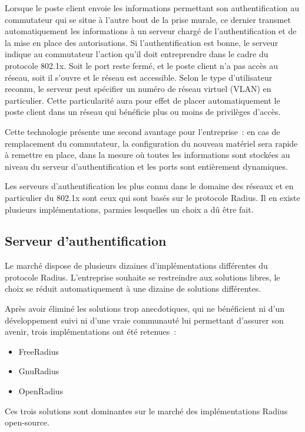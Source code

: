 Lorsque le poste client envoie les informations permettant son authentification au commutateur qui se situe à l'autre bout de la prise murale, ce dernier transmet automatiquement les informations à un serveur chargé de l'authentification et de la mise en place des autorisations. Si l'authentification est bonne, le serveur indique au commutateur l'action qu'il doit entreprendre dans le cadre du protocole 802.1x. Soit le port reste fermé, et le poste client n'a pas accès au réseau, soit il s'ouvre et le réseau est accessible. Selon le type d'utilisateur reconnu, le serveur peut spécifier un numéro de réseau virtuel (VLAN) en particulier. Cette particularité aura pour effet de placer automatiquement le poste client dans un réseau qui bénéficie plus ou moins de privilèges d'accès.

Cette technologie présente une second avantage pour l'entreprise~: en cas de remplacement du commutateur, la configuration du nouveau matériel sera rapide à remettre en place, dans la mesure où toutes les informations sont stockées au niveau du serveur d'authentification et les ports sont entièrement dynamiques.

Les serveurs d'authentification les plus connu dans le domaine des réseaux et en particulier du 802.1x sont ceux qui sont basés sur le protocole Radius. Il en existe plusieurs implémentations, parmies lesquelles un choix a dû être fait.

\subsection{Serveur d'authentification}

Le marché dispose de plusieurs dizaines d'implémentations différentes du protocole Radius. L'entreprise souhaite se restreindre aux solutions libres, le choix se réduit automatiquement à une dizaine de solutions différentes.

Après avoir éliminé les solutions trop anecdotiques, qui ne bénéficient ni d'un développement suivi ni d'une vraie communauté lui permettant d'assurer son avenir, trois implémentations ont été retenues~:

\begin{itemize}
\item FreeRadius
\item GnuRadius
\item OpenRadius
\end{itemize}

Ces trois solutions sont dominantes sur le marché des implémentations Radius open-source.

